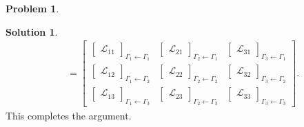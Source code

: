 \documentclass{article}
\theoremstyle{definition}
\newtheorem*{prob*}{Problem}
\newtheorem*{sln*}{Solution}
\newcommand{\lag}{\mathcal{L}}
\begin{document}
\begin{prob*}
\begin{sln*}
\begin{align*}
	&= \begin{bmatrix}
	\begin{bmatrix}
	\lag_{11}
	\end{bmatrix}_{\Gamma_1\leftarrow\Gamma_1}
	&
	\begin{bmatrix}
	\lag_{21}
	\end{bmatrix}_{\Gamma_2\leftarrow\Gamma_1}
	&
	\begin{bmatrix}
	\lag_{31}
	\end{bmatrix}_{\Gamma_3\leftarrow\Gamma_1}
	\\
	\begin{bmatrix}
	\lag_{12}
	\end{bmatrix}_{\Gamma_1\leftarrow\Gamma_2}
	&
	\begin{bmatrix}
	\lag_{22}
	\end{bmatrix}_{\Gamma_2\leftarrow\Gamma_2}
	&
	\begin{bmatrix}
	\lag_{32}
	\end{bmatrix}_{\Gamma_3\leftarrow\Gamma_2}
	\\
	\begin{bmatrix}
	\lag_{13}
	\end{bmatrix}_{\Gamma_1\leftarrow\Gamma_3}
	&
	\begin{bmatrix}
	\lag_{23}
	\end{bmatrix}_{\Gamma_2\leftarrow\Gamma_3}
	&
	\begin{bmatrix}
	\lag_{33}
	\end{bmatrix}_{\Gamma_3\leftarrow\Gamma_3}
	\end{bmatrix}.
	\end{align*}
	This completes the argument. \\
	

\end{sln*}
\end{prob*}
\end{document}
